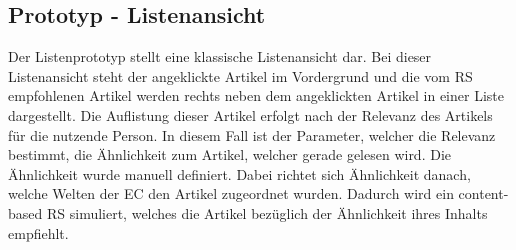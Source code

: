 \subsection{Prototyp - Listenansicht}
Der Listenprototyp stellt eine klassische Listenansicht dar.
Bei dieser Listenansicht steht der angeklickte Artikel im Vordergrund und die vom \ac{RS} empfohlenen Artikel werden rechts neben dem angeklickten Artikel in einer Liste dargestellt.
Die Auflistung dieser Artikel erfolgt nach der Relevanz des Artikels für die nutzende Person.
In diesem Fall ist der Parameter, welcher die Relevanz bestimmt, die Ähnlichkeit zum Artikel, welcher gerade gelesen wird.
Die Ähnlichkeit wurde manuell definiert.
Dabei richtet sich Ähnlichkeit danach, welche Welten der \ac{EC} den Artikel zugeordnet wurden.
Dadurch wird ein content-based \ac{RS} simuliert, welches die Artikel bezüglich der Ähnlichkeit ihres Inhalts empfiehlt.\\
